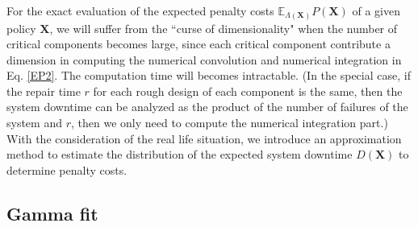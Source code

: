 \documentclass[preprint,12pt]{elsarticle}
\begin{document}
For the exact evaluation of the expected penalty costs $\mathbb{E}_{\Lambda(\boldsymbol{X})}P(\boldsymbol{X})$ of a given policy $\boldsymbol{X}$, we will suffer from the ``curse of dimensionality" when the number of critical components becomes large, since each critical component contribute a dimension in computing the numerical convolution and numerical integration in Eq. \eqref{EP2}. The computation time will becomes intractable. (In the special case, if the repair time $r$ for each rough design of each component is the same, then the system downtime can be analyzed as the product of the number of failures of the system and $r$, then we only need to compute the numerical integration part.) With the consideration of the real life situation, we introduce an approximation method to estimate the distribution of the expected system downtime $D(\boldsymbol{X})$ to determine penalty costs.
\subsection{Gamma fit}
\end{document}
